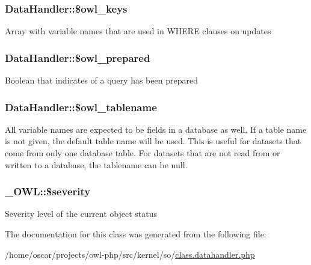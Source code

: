\subsubsection[{\$owl\_\-keys}]{\setlength{\rightskip}{0pt plus 5cm}DataHandler::\$owl\_\-keys}\label{classDataHandler_a8d398720bce975159b2d13ad7a941bc7}
Array with variable names that are used in WHERE clauses on updates 
\subsubsection[{\$owl\_\-prepared}]{\setlength{\rightskip}{0pt plus 5cm}DataHandler::\$owl\_\-prepared}\label{classDataHandler_ae6093d21291ed3ab3183e11962452928}
Boolean that indicates of a query has been prepared 
\subsubsection[{\$owl\_\-tablename}]{\setlength{\rightskip}{0pt plus 5cm}DataHandler::\$owl\_\-tablename}\label{classDataHandler_a24620784bde262bdd02227962d3b9605}
All variable names are expected to be fields in a database as well. If a table name is not given, the default table name will be used. This is useful for datasets that come from only one database table. For datasets that are not read from or written to a database, the tablename can be null. 
\subsubsection[{\$severity}]{\setlength{\rightskip}{0pt plus 5cm}\_\-OWL::\$severity}\label{class__OWL_ad26b40a9dbbacb33e299b17826f8327c}
Severity level of the current object status 

The documentation for this class was generated from the following file:\begin{DoxyCompactItemize}
\item 
/home/oscar/projects/owl-\/php/src/kernel/so/\hyperlink{class_8datahandler_8php}{class.datahandler.php}\end{DoxyCompactItemize}
